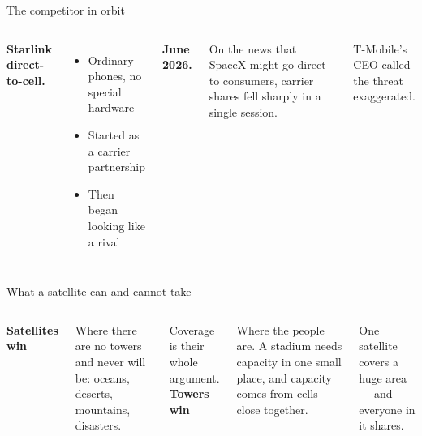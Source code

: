 \begin{frame}{The competitor in orbit}
  \begin{columns}[T,onlytextwidth]
      \large\textbf{Starlink direct-to-cell.}

      \vspace{0.6em}
      \small
      \begin{itemize}\itemsep5pt
        \item Ordinary phones, no special hardware
        \item Started as a carrier partnership
        \item Then began looking like a rival
      \end{itemize}
      \large\textbf{June 2026.}

      \vspace{0.6em}
      \small
      On the news that SpaceX might go direct to consumers, carrier
      shares fell sharply in a single session.

      \vspace{0.5em}
      T-Mobile's CEO called the threat exaggerated.
  \end{columns}

\end{frame}

\begin{frame}{What a satellite can and cannot take}
  \vspace{0.4em}
  \begin{columns}[T,onlytextwidth]
      \large\textbf{\textcolor{softgreen}{Satellites win}}

      \vspace{0.5em}
      \small
      Where there are no towers and never will be: oceans, deserts,
      mountains, disasters.

      \vspace{0.5em}
      Coverage is their whole argument.
      \large\textbf{\textcolor{coreorange}{Towers win}}

      \vspace{0.5em}
      \small
      Where the people are. A stadium needs capacity in one small place,
      and capacity comes from cells close together.

      \vspace{0.5em}
      One satellite covers a huge area --- and everyone in it shares.
  \end{columns}

  \vspace{0.9em}
\end{frame}

